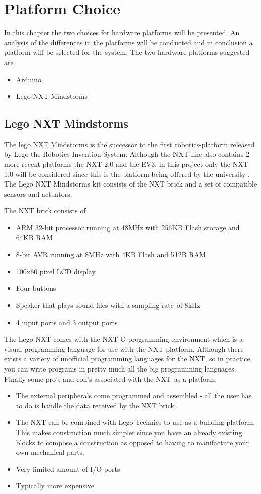 \chapter{Platform Choice}
In this chapter the two choices for hardware platforms will be presented. An analysis of the differences in the platforms will be conducted and in conclusion a platform will be selected for the system. The two hardware platforms suggested are
\begin{itemize}
	\item Arduino
	\item Lego NXT Mindstorms
\end{itemize}

\section{Lego NXT Mindstorms}
The lego NXT Mindstorms is the successor to the first robotics-platform released by Lego the Robotics Invention System.
Although the NXT line also contains 2 more recent platforms the NXT 2.0 and the EV3, in this project only the NXT 1.0 will be considered
since this is the platform being offered by the university \Source.\nl
The Lego NXT Mindstorms kit consists of the NXT brick and a set of compatible sensors and actuators.\nl

The NXT brick consists of \Source
\begin{itemize}
  \item ARM 32-bit processor running at 48MHz with 256KB Flash storage and 64KB RAM
  \item 8-bit AVR running at 8MHz with 4KB Flash and 512B RAM
  \item 100x60 pixel LCD display
  \item Four buttons
  \item Speaker that plays sound files with a sampling rate of 8kHz
  \item 4 input ports and 3 output ports
\end{itemize}

The Lego NXT comes with the NXT-G programming environment which is a visual programming language for use with the NXT platform.
Although there exists a variety of unofficial programming languages for the NXT, so in practice you can write programs
in pretty much all the big programming languages\Source.
Finally some pro's and con's associated with the NXT as a platform\Source:
\begin{itemize}
  \item The external peripherals come programmed and assembled - all the user has to do is handle the data received by the NXT brick
  \item The NXT can be combined with Lego Technics to use as a building platform. This makes construction much simpler since you have
  an already existing blocks to compose a construction as opposed to having to manifacture your own mechanical parts.
  \item Very limited amount of I/O ports
  \item Typically more expensive
\end{itemize}
